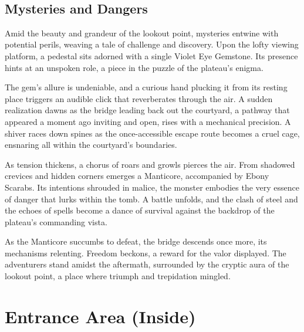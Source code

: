\vfill\eject\hfill\\\vspace*{0.5\fontdimen6\font}
\subsection*{Mysteries and Dangers}
{\entryfont
	Amid the beauty and grandeur of the lookout point, mysteries entwine with potential perils, weaving a tale of challenge and discovery. Upon the lofty viewing platform, a pedestal sits adorned with a single Violet Eye Gemstone. Its presence hints at an unspoken role, a piece in the puzzle of the plateau's enigma.
	
	The gem's allure is undeniable, and a curious hand plucking it from its resting place triggers an audible click that reverberates through the air. A sudden realization dawns as the bridge leading back out the courtyard, a pathway that appeared a moment ago inviting and open, rises with a mechanical precision. A shiver races down spines as the once-accessible escape route becomes a cruel cage, ensnaring all within the courtyard's boundaries.
	
	As tension thickens, a chorus of roars and growls pierces the air. From shadowed crevices and hidden corners emerges a Manticore, accompanied by  Ebony Scarabs. Its intentions shrouded in malice, the monster embodies the very essence of danger that lurks within the tomb. A battle unfolds, and the clash of steel and the echoes of spells become a dance of survival against the backdrop of the plateau's commanding vista.
	
	 As the Manticore succumbs to defeat, the bridge descends once more, its mechanisms relenting. Freedom beckons, a reward for the valor displayed. The adventurers stand amidst the aftermath, surrounded by the cryptic aura of the lookout point, a place where triumph and trepidation mingled.
}

\clearpage

\section*{Entrance Area (Inside)}